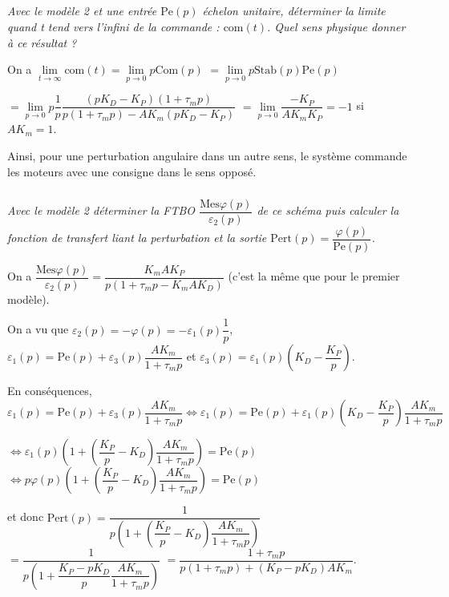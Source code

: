 \documentclass[10pt,fleqn]{article} %
\begin{document}
\begin{multicols}{2}
\subparagraph{\label{q28}}
\textit{Avec le modèle 2 et une entrée $\text{Pe}(p)$ échelon unitaire, déterminer la limite quand t tend vers
l’infini de la commande : $\text{com}(t)$. Quel sens physique donner à ce résultat ?}
\ifprof
\begin{corrige}
On a $\lim\limits_{t\to\infty}\text{com}(t) = \lim\limits_{p\to 0}p\text{Com}(p)$ 
$=\lim\limits_{p\to 0}p\text{Stab}(p)\text{Pe}(p)$ 

  $= \lim\limits_{p\to 0}p\dfrac{1}{p} \dfrac{\left(pK_D-K_P \right) \left(1+\tau_m p\right)}{p\left(1+\tau_m p \right) - AK_m \left( pK_D-K_P\right) }$
   $= \lim\limits_{p\to 0} \dfrac{-K_P }{  AK_m  K_P }=-1$ si $AK_m=1$.
  
  Ainsi, pour une perturbation angulaire dans un autre sens, le système commande les moteurs avec une consigne dans le sens opposé. 
\end{corrige}
\else
\fi

\subparagraph{}
\textit{Avec le modèle 2 déterminer la FTBO $\dfrac{\text{Mes}\varphi(p)}{\varepsilon_2(p)}$ de ce schéma puis calculer la fonction de transfert liant la perturbation et la sortie $\text{Pert}(p)=\dfrac{\varphi(p)}{\text{Pe}(p)}$.}
\ifprof
\begin{corrige}

On a  $\dfrac{\text{Mes}\varphi(p)}{\varepsilon_2(p)} = \dfrac{K_m A K_P}{p\left(1+\tau_m p-K_m A K_D \right)}$ (c'est la même que pour le premier modèle).

On a vu que  $\varepsilon_2(p) = -\varphi(p) = -\varepsilon_1(p)\dfrac{1}{p}$, $\varepsilon_1(p)=\text{Pe}(p)+\varepsilon_3(p)\dfrac{AK_m}{1+\tau_m p}$ et $\varepsilon_3(p)=\varepsilon_1(p)\left(K_D-\dfrac{K_P}{p} \right)$. 

En conséquences, $\varepsilon_1(p)=\text{Pe}(p)+\varepsilon_3(p)\dfrac{AK_m}{1+\tau_m p} \Longleftrightarrow 
\varepsilon_1(p)=\text{Pe}(p)+\varepsilon_1(p)\left(K_D-\dfrac{K_P}{p} \right)\dfrac{AK_m}{1+\tau_m p}$

$ \Leftrightarrow 
\varepsilon_1(p)\left( 1+\left(\dfrac{K_P}{p}-K_D \right)\dfrac{AK_m}{1+\tau_m p}\right)=\text{Pe}(p)$
$ \Leftrightarrow 
p\varphi(p)\left( 1+\left(\dfrac{K_P}{p}-K_D \right)\dfrac{AK_m}{1+\tau_m p}\right)=\text{Pe}(p)$

et donc $\text{Pert}(p)=\dfrac{1}{p\left( 1+\left(\dfrac{K_P}{p}-K_D \right)\dfrac{AK_m}{1+\tau_m p}\right)}$
$=\dfrac{1}{p\left( 1+\dfrac{K_P-pK_D}{p}\dfrac{AK_m}{1+\tau_m p}\right)}$
$=\dfrac{1+\tau_m p}{p \left(1+\tau_m p\right)+\left(K_P-pK_D\right)AK_m}$.



\end{corrige}
\end{multicols}
\end{document}
